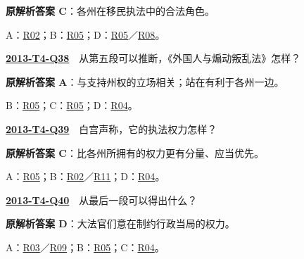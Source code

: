 \documentclass[11pt,a4paper]{article}
\begin{document}
\noindent\textbf{原解析答案 C}：各州在移民执法中的合法角色。\par\nopagebreak
\noindent A：\hyperref[cat-R02]{R02}；B：\hyperref[cat-R05]{R05}；D：\hyperref[cat-R05]{R05}／\hyperref[cat-R08]{R08}。\par\smallskip
{}\label{idx-2013-T4-Q38}\noindent\textbf{\href{https://zj139.github.io/math-notes/english/97d8ddcd3db235aaa541d5d5/\#q38}{2013-T4-Q38}}　从第五段可以推断，《外国人与煽动叛乱法》怎样？\par\nopagebreak
\noindent\textbf{原解析答案 A}：与支持州权的立场相关；站在有利于各州一边。\par\nopagebreak
\noindent B：\hyperref[cat-R05]{R05}；C：\hyperref[cat-R05]{R05}；D：\hyperref[cat-R04]{R04}。\par\smallskip
{}\label{idx-2013-T4-Q39}\noindent\textbf{\href{https://zj139.github.io/math-notes/english/97d8ddcd3db235aaa541d5d5/\#q39}{2013-T4-Q39}}　白宫声称，它的执法权力怎样？\par\nopagebreak
\noindent\textbf{原解析答案 C}：比各州所拥有的权力更有分量、应当优先。\par\nopagebreak
\noindent A：\hyperref[cat-R05]{R05}；B：\hyperref[cat-R02]{R02}／\hyperref[cat-R11]{R11}；D：\hyperref[cat-R04]{R04}。\par\smallskip
{}\label{idx-2013-T4-Q40}\noindent\textbf{\href{https://zj139.github.io/math-notes/english/97d8ddcd3db235aaa541d5d5/\#q40}{2013-T4-Q40}}　从最后一段可以得出什么？\par\nopagebreak
\noindent\textbf{原解析答案 D}：大法官们意在制约行政当局的权力。\par\nopagebreak
\noindent A：\hyperref[cat-R03]{R03}／\hyperref[cat-R09]{R09}；B：\hyperref[cat-R05]{R05}；C：\hyperref[cat-R04]{R04}。\par\smallskip
\clearpage
\end{document}
